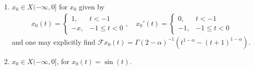 \documentclass{svproc}
\newcommand{\dsomething}[1]{\mathrm{d}#1}
\begin{document}
\begin{example}
\begin{enumerate}[label=(\roman*)]
\begin{align}
\begin{cases}
				-\alpha|t|^{\alpha-1},&t\in (-1,0)\\
				0,&t\leq -1
			\end{cases}
		\end{align}
		Notice that $x_0'(t)$ grows unboundedly as $t\to 0-$. The forcing $\mathcal F x_0$ at time $t=0$ is given by
		\begin{align}
			\mathcal F x_0(0)&=\int_{-\infty}^0\frac{(-\tau)^{-\alpha}}{\Gamma(1-\alpha)}x_0'(\tau)\dsomething{\tau}\\
			&= \frac{-\alpha}{\Gamma(1-\alpha)}\int_{-1}^0{(-\tau)^{-\alpha}}{}(-\tau)^{\alpha-1}\dsomething{\tau}= \frac{-\alpha}{\Gamma(1-\alpha)}\int_{0}^1s^{-1}\dsomething{s},
		\end{align} where the latter integral is unbounded and $\mathcal F x_0(t)$ is thus is not defined at $t=0$.
        \item \label{item_constant}$x_0 \in X(-\infty,0]$ for $x_0$ given by \begin{align}
			x_0(t)=\begin{cases}
				1, & t<-1\\
				-x,&-1\leq t<0
			\end{cases},
			\quad x_0'(t) = \begin{cases}
				0, & t<-1\\
				-1,&-1\leq t<0
			\end{cases}
		\end{align} and one may explicitly find $\mathcal Fx_0(t) = \Gamma(2-\alpha)^{-1}(t^{1-\alpha}-(t+1)^{1-\alpha})$.
		\item \label{item_sine} $x_0 \in X(-\infty,0]$, for $x_0(t)= \sin(t)$.
	\end{enumerate}
\end{example}
\end{document}
